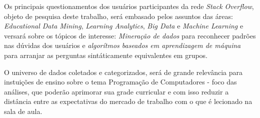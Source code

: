 \documentclass[
	12pt,				%
	openright,		%
	twoside,			%
	a4paper,			%
	english,				%
	french,				%
	spanish,			%
	brazil,				%
	]{abntex2}
\begin{document}

 Os principais questionamentos dos usuários participantes da rede \textit{Stack Overflow}, objeto de pesquisa deste trabalho, será embasado pelos assuntos das áreas: \textsf{\textit{Educational Data Mining}}, \textsf{\textit{Learning Analytics}}, \textsf{\textit{Big Data}} e \textsf{\textit{Machine Learning}} e versará sobre os tópicos de interesse: \emph{Mineração de dados} para reconhecer padrões nas dúvidas dos usuários e \emph{algorítmos baseados em aprendizagem de máquina} para arranjar as perguntas sintáticamente equivalentes em grupos. 

O universo de dados coletados e categorizados, será de grande relevância  para instuições de ensino sobre o tema Programação de Computadores - foco das análises, que poderão aprimorar sua grade curricular e com isso reduzir a distância entre as expectativas do mercado de trabalho com o que é lecionado na sala de aula.








\postextual

\nocite{Kelleher}
\nocite{Erl}
\nocite{Trevor}
\nocite{Bishop}
\nocite{Gareth}
\nocite{Flach}
\nocite{Nunes}
\nocite{Witten}
\nocite{Romero}
\nocite{RomeroHand}
\nocite{Samira}

\end{document}
